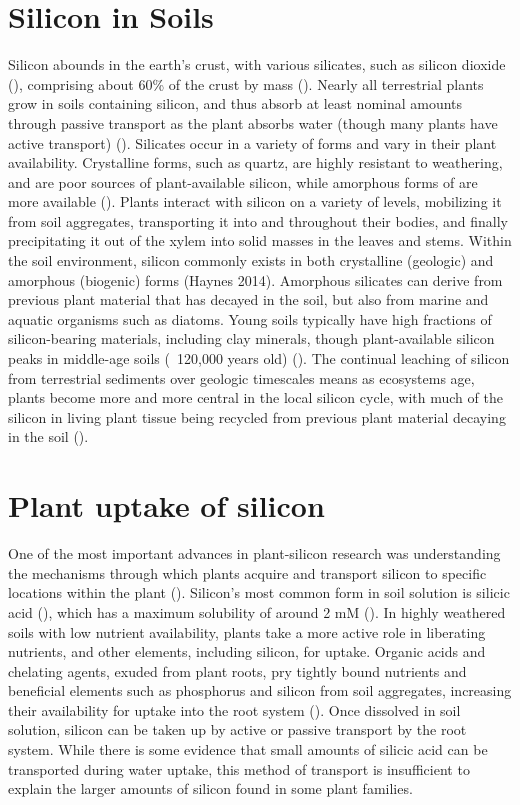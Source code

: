 \documentclass[12pt, letterpaper]{report}
\begin{document}
\section{Silicon in Soils}

Silicon abounds in the earth’s crust, with various silicates, such as silicon dioxide (), comprising about 60\% of the crust by mass (\cite{holland_41_2014}). Nearly all terrestrial plants grow in soils containing silicon, and thus absorb at least nominal amounts through passive transport as the plant absorbs water (though many plants have active transport) (\cite{debona_silicons_2017}). Silicates occur in a variety of forms and vary in their plant availability. Crystalline forms, such as quartz, are highly resistant to weathering, and are poor sources of plant-available silicon, while amorphous forms of  are more available (\cite{fraysse_surface_2009}). 
Plants interact with silicon on a variety of levels, mobilizing it from soil aggregates, transporting it into and throughout their bodies, and finally precipitating it out of the xylem into solid masses in the leaves and stems. Within the soil environment, silicon commonly exists in both crystalline (geologic) and amorphous (biogenic) forms (Haynes 2014). Amorphous silicates can derive from previous plant material that has decayed in the soil, but also from marine and aquatic organisms such as diatoms. Young soils typically have high fractions of silicon-bearing materials, including clay minerals, though plant-available silicon peaks in middle-age soils (~120,000 years old) (\cite{de_tombeur_silicon_2020}). The continual leaching of silicon from terrestrial sediments over geologic timescales means as ecosystems age, plants become more and more central in the local silicon cycle, with much of the silicon in living plant tissue being recycled from previous plant material decaying in the soil (\cite{de_tombeur_plants_2020}).  

\section{Plant uptake of silicon}

One of the most important advances in plant-silicon research was understanding the mechanisms through which plants acquire and transport silicon to specific locations within the plant (\cite{coskun_controversies_2019}). Silicon’s most common form in soil solution is silicic acid (), which has a maximum solubility of around 2 mM (\cite{haynes_contemporary_2014}). In highly weathered soils with low nutrient availability, plants take a more active role in liberating nutrients, and other elements, including silicon, for uptake. Organic acids and chelating agents, exuded from plant roots, pry tightly bound nutrients and beneficial elements such as phosphorus and silicon from soil aggregates, increasing their availability for uptake into the root system (\cite{de_tombeur_silicon_2021-1}). Once dissolved in soil solution, silicon can be taken up by active or passive transport by the root system. While there is some evidence that small amounts of silicic acid can be transported during water uptake, this method of transport is insufficient to explain the larger amounts of silicon found in some plant families. 
\end{document}
